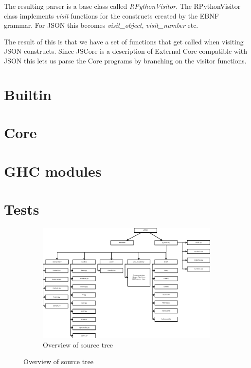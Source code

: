 The resulting parser is a base class called \emph{RPythonVisitor}. The RPythonVisitor
class implements \emph{visit} functions for the constructs created by the EBNF grammar.
For JSON this becomes \emph{visit\_object}, \emph{visit\_number} etc.

The result of this is that we have a set of functions that get called when visiting
JSON constructs. Since JSCore is a description of External-Core compatible with
JSON this lets us parse the Core programs by branching on the visitor functions.



\section{Builtin}

\section{Core}

\section{GHC modules}

\section{Tests}

\begin{figure}
\begin{figure}[H]
\centering
\includegraphics[width=\textheight]{../diags/overview.pdf}

\caption{Overview of source tree}
\label{fig:overview}

\end{figure}
\end{figure}


